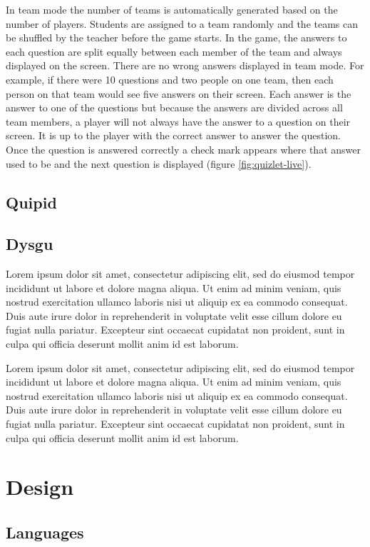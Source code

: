 \documentclass{article}
\begin{document}
In team mode the number of teams is automatically generated based on the number of players. Students are assigned to a team randomly and the teams can be shuffled by the teacher before the game starts. In the game, the answers to each question are split equally between each member of the team and always displayed on the screen. There are no wrong answers displayed in team mode. For example, if there were 10 questions and two people on one team, then each person on that team would see five answers on their screen. Each answer is the answer to one of the questions but because the answers are divided across all team members, a player will not always have the answer to a question on their screen. It is up to the player with the correct answer to answer the question. Once the question is answered correctly a check mark appears where that answer used to be and the next question is displayed (figure \ref{fig:quizlet-live}).

\subsection{Quipid}
\subsection{Dysgu}



Lorem ipsum dolor sit amet, consectetur adipiscing elit, sed do eiusmod tempor incididunt ut labore et dolore magna aliqua. Ut enim ad minim veniam, quis nostrud exercitation ullamco laboris nisi ut aliquip ex ea commodo consequat. Duis aute irure dolor in reprehenderit in voluptate velit esse cillum dolore eu fugiat nulla pariatur. Excepteur sint occaecat cupidatat non proident, sunt in culpa qui officia deserunt mollit anim id est laborum.

Lorem ipsum dolor sit amet, consectetur adipiscing elit, sed do eiusmod tempor incididunt ut labore et dolore magna aliqua. Ut enim ad minim veniam, quis nostrud exercitation ullamco laboris nisi ut aliquip ex ea commodo consequat. Duis aute irure dolor in reprehenderit in voluptate velit esse cillum dolore eu fugiat nulla pariatur. Excepteur sint occaecat cupidatat non proident, sunt in culpa qui officia deserunt mollit anim id est laborum.

\section{Design}
	\subsection{Languages}
\end{document}
